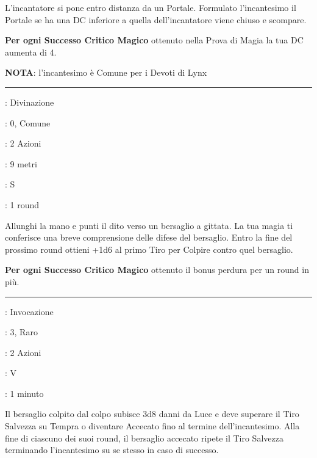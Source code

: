 \begin{multicols}{2}
L'incantatore si pone entro distanza da un Portale. Formulato l'incantesimo il Portale se ha una DC inferiore a quella dell'incantatore viene chiuso e scompare.

\textbf{Per ogni Successo Critico Magico} ottenuto nella Prova di Magia la tua DC aumenta di 4.

\textbf{NOTA}: l'incantesimo è Comune per i Devoti di Lynx

\smallskip\noindent\rule{\linewidth}{2pt} \hypertarget{Colpo Accurato}{}\medskip{}
\noindent
\begin{description}[noitemsep, topsep=0pt, parsep=0pt, partopsep=0pt, leftmargin=0cm, labelwidth=2.8cm]
	\item[\textbf{Lista di Magia}]: Divinazione
	\item[\textbf{Livello}]: 0, Comune
	\item[\textbf{T. di Lancio}]: 2 Azioni
	\item[\textbf{Gittata}]: 9 metri
	\item[\textbf{Componenti}]: S
	\item[\textbf{Durata}]: 1 round
\end{description}

Allunghi la mano e punti il dito verso un bersaglio a gittata. La tua magia ti conferisce una breve comprensione delle difese del bersaglio. Entro la fine del prossimo round ottieni +1d6 al primo Tiro per Colpire contro quel bersaglio.

\textbf{Per ogni Successo Critico Magico} ottenuto il bonus perdura per un round in più.

\smallskip\noindent\rule{\linewidth}{2pt} \hypertarget{Colpo Accecante}{}\medskip{}
\noindent
\begin{description}[noitemsep, topsep=0pt, parsep=0pt, partopsep=0pt, leftmargin=0cm, labelwidth=2.8cm]
	\item[\textbf{Lista di Magia}]: Invocazione
	\item[\textbf{Livello}]: 3, Raro
	\item[\textbf{T. di Lancio}]: 2 Azioni
	\item[\textbf{Componenti}]: V
	\item[\textbf{Durata}]: 1 minuto
\end{description}

Il bersaglio colpito dal colpo subisce 3d8 danni da Luce e deve superare il Tiro Salvezza su Tempra o diventare Accecato fino al termine dell'incantesimo. Alla fine di ciascuno dei suoi round, il bersaglio accecato ripete il Tiro Salvezza terminando l'incantesimo su se stesso in caso di successo.


\end{multicols}
